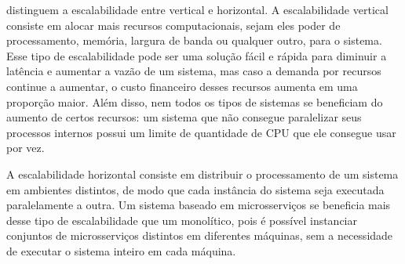 
\cite{4228359} distinguem a escalabilidade entre vertical e horizontal. A escalabilidade vertical consiste em alocar mais recursos computacionais, sejam eles poder de processamento, memória, largura de banda ou qualquer outro, para o sistema. Esse tipo de escalabilidade pode ser uma solução fácil e rápida para diminuir a latência e aumentar a vazão de um sistema, mas caso a demanda por recursos continue a aumentar, o custo financeiro desses recursos aumenta em uma proporção maior. Além disso, nem todos os tipos de sistemas se beneficiam do aumento de certos recursos: um sistema que não consegue paralelizar seus processos internos possui um limite de quantidade de CPU que ele consegue usar por vez. 


A escalabilidade horizontal consiste em distribuir o processamento de um sistema em ambientes distintos, de modo que cada instância do sistema seja executada paralelamente a outra. Um sistema baseado em microsserviços se beneficia mais desse tipo de escalabilidade que um monolítico, pois é possível instanciar conjuntos de microsserviços distintos em diferentes máquinas, sem a necessidade de executar o sistema  inteiro em cada máquina. 


